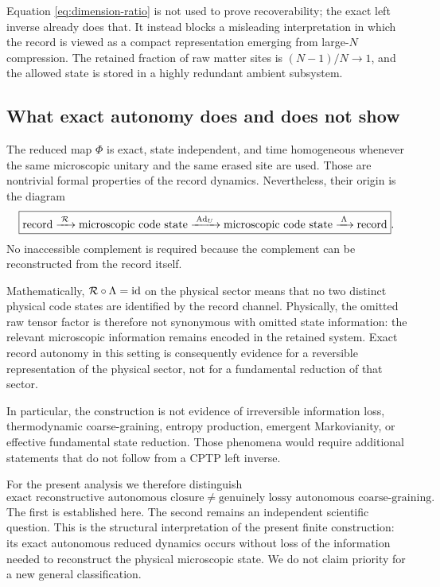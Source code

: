 Equation \eqref{eq:dimension-ratio} is not used to prove recoverability; the exact left inverse already does that.  It instead blocks a misleading interpretation in which the record is viewed as a compact representation emerging from large-$N$ compression.  The retained fraction of raw matter sites is $(N-1)/N\to1$, and the allowed state is stored in a highly redundant ambient subsystem.

\subsection{What exact autonomy does and does not show}

The reduced map $\Phi$ is exact, state independent, and time homogeneous whenever the same microscopic unitary and the same erased site are used.  Those are nontrivial formal properties of the record dynamics.  Nevertheless, their origin is the diagram
\begin{equation}
  \boxed{
  \text{record}
  \xrightarrow{\;\mathcal R\;}
  \text{microscopic code state}
  \xrightarrow{\;\operatorname{Ad}_U\;}
  \text{microscopic code state}
  \xrightarrow{\;\Lambda\;}
  \text{record}
  }.
  \label{eq:reconstructive-diagram}
\end{equation}
No inaccessible complement is required because the complement can be reconstructed from the record itself.

Mathematically, $\mathcal R\circ\Lambda=\operatorname{id}$ on the physical sector means that no two distinct physical code states are identified by the record channel.  Physically, the omitted raw tensor factor is therefore not synonymous with omitted state information: the relevant microscopic information remains encoded in the retained system.  Exact record autonomy in this setting is consequently evidence for a reversible representation of the physical sector, not for a fundamental reduction of that sector.

In particular, the construction is not evidence of irreversible information loss, thermodynamic coarse-graining, entropy production, emergent Markovianity, or effective fundamental state reduction.  Those phenomena would require additional statements that do not follow from a CPTP left inverse.

For the present analysis we therefore distinguish
\begin{equation}
  \boxed{
  \text{exact reconstructive autonomous closure}
  \neq
  \text{genuinely lossy autonomous coarse-graining}.
  }
\end{equation}
The first is established here.  The second remains an independent scientific question.  This is the structural interpretation of the present finite construction: its exact autonomous reduced dynamics occurs without loss of the information needed to reconstruct the physical microscopic state.  We do not claim priority for a new general classification.
